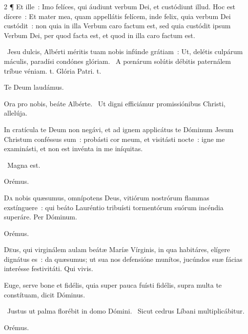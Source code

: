 \documentclass[9pt,twoside]{extarticle}
\begin{document}
\begin{multicols}{2}
¶ Et ille~: Imo felíces, qui áudiunt verbum Dei, et custódiunt illud. Hoc est dícere~: Et mater mea, quam appellátis felícem, inde felix, quia verbum Dei custódit~: non quia in illa Verbum caro factum est, sed quia custódit ipsum Verbum Dei, per quod facta est, et quod in illa caro factum est.

\begin{tightlist}{}
\item {}~Jesu dulcis, Albérti méritis tuam nobis infúnde grátiam~: \textred{*} Ut, delétis culpárum máculis, paradísi condónes glóriam.
~A pœnárum solútis débitis paternálem tríbue véniam. t. Glória Patri. t.
\item Te Deum laudámus.
\item {} Ora pro nobis, beáte Albérte. ~Ut digni efficiámur promissiónibus Christi, allelúja.
\item {} In cratícula te Deum non negávi, et ad ignem applicátus te Dóminum Jesum Christum conféssus sum~: probásti cor meum, et visitásti nocte~: igne me examinásti, et non est invénta in me iníquitas.
\item {}~Magna est.
\item Orémus. \hfill {}
\end{tightlist}

\lettrine{D}a nobis quæsumus, omnípotens Deus, vitiórum nostrórum flammas exstínguere~: qui beáto Lauréntio tribuísti tormentórum suórum incéndia superáre. Per Dóminum.

\begin{tightlist}{}
\item {}
\item Orémus. \hfill {}
\end{tightlist}

\lettrine{D}eus, qui virginálem aulam beátæ Maríæ Vírginis, in qua habitáres, elígere dignátus es~: da quæsumus; ut sua nos defensióne munítos, jucúndos suæ fácias interésse festivitáti. Qui vivis.

\begin{tightlist}{}
\item {} Euge, serve bone et fidélis, quia super pauca fuísti fidélis, supra multa te constítuam, dicit Dóminus.
\item {}~Justus ut palma florébit in domo Dómini. ~Sicut cedrus Líbani multiplicábitur.
\item Orémus. \hfill {}
\end{tightlist}


\end{multicols}
\end{document}
